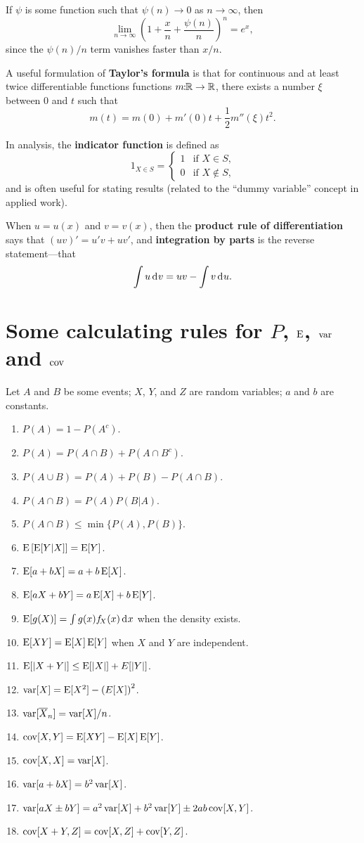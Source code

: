 \documentclass[10pt]{article}
\begin{document}
If $\psi$ is some function such that $\psi(n) \rightarrow 0$ as $n\rightarrow\infty$,
then \[ \lim_{n\rightarrow\infty} \left(1 + \frac{x}{n} + \frac{\psi(n)}{n}  \right)^n = e^x,\]
since the $\psi(n)/n$ term vanishes faster than $x/n$.

A useful formulation of \textbf{Taylor's formula} is that for continuous and at
least twice differentiable functions functions $m\!\!:\!\!\mathbb{R} \rightarrow \mathbb{R}$, there
exists a number $\xi$ between $0$ and $t$ such that \[ m(t) = m(0) + m'(0) t +
\frac{1}{2} m''(\xi) t^2.\]

In analysis, the \textbf{indicator function} is defined as 
\[ 1_{X\in S} = \begin{cases} 1 & \text{if $X\in S$,} \\ 0 & \text{if $X\notin S$,}\end{cases}\]
and is often useful for stating results (related to the ``dummy variable'' concept in applied work).

When $u=u(x)$ and $v=v(x)$, then the \textbf{product rule of differentiation}
says that $(u v)' = u'v + u v'$,  and \textbf{integration by parts} is the reverse statement---that
\[\int u \rd v = u v - \int v \rd u. \]

\section{Some calculating rules for $P$, $\operatorname{E}$, $\operatorname{var}$ and $\operatorname{cov}$}
Let $A$ and $B$ be some events; $X$, $Y$, and $Z$ are random variables; $a$ and $b$
are constants.
\begin{enumerate}
\item $P(A) = 1 - P(A^c)$.
\item $P(A) = P(A\cap B) + P(A\cap B^c)$.
\item $P(A\cup B) = P(A) + P(B) - P(A\cap B)$.
\item $P(A \cap B) = P(A)P(B|A)$.
\item $P(A\cap B) \leq \min\{P(A), P(B)\}$.
\item $\operatorname{E}\left[\operatorname{E}[Y|X]\right] = \operatorname{E}[Y]$.
\item $\operatorname{E}[a + bX ] = a + b\operatorname{E}[X]$.
\item $\operatorname{E}[a X + b Y] = a\operatorname{E}[X] + b\operatorname{E}[Y]$.
\item $\E[g(X)] = \int g(x) f_{\!X}(x) \rd x$ when the density exists.
\item $\operatorname{E}[XY] = \operatorname{E}[X]\operatorname{E}[Y]$ when $X$ and $Y$ are independent.
\item $\operatorname{E}[|X+Y|] \leq \operatorname{E}[|X|] + E[|Y|]$.
\item $\operatorname{var}[X] = \operatorname{E}[X^2] - \left(E[X]\right)^2$.
\item $\operatorname{var}[\overline{X}_n] = \operatorname{var}[X] / n$. 
\item $\operatorname{cov}[X,Y] = \operatorname{E}[XY] - \operatorname{E}[X]\operatorname{E}[Y]$.
\item $\operatorname{cov}[X,X] = \operatorname{var}[X]$.
\item $\operatorname{var}[a + bX] = b^2 \operatorname{var}[X]$.
\item $\operatorname{var}[a X \pm b Y] = a^2 \operatorname{var}[X] + b^2 \operatorname{var}[Y] \pm 2 a b \operatorname{cov}[X,Y]$.
\item $\operatorname{cov}[X+Y,Z] =  \operatorname{cov}[X,Z] + \operatorname{cov}[Y,Z]$.
\end{enumerate}
\end{document}
